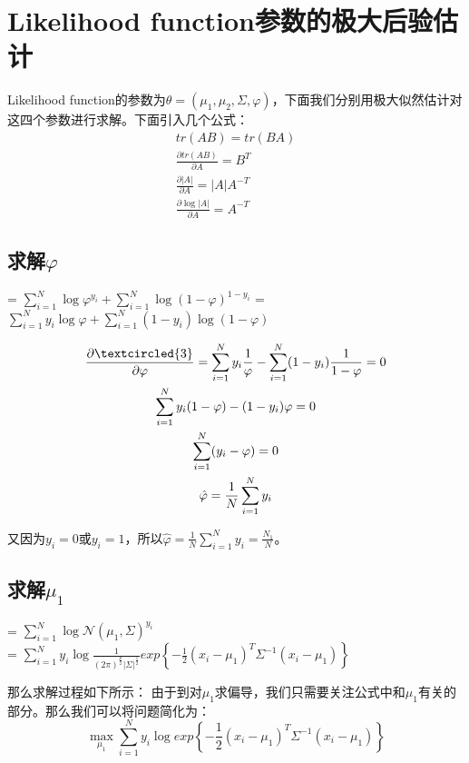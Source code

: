 \documentclass[a4paper]{article}
\begin{document}
\section{Likelihood function参数的极大后验估计}
Likelihood function的参数为$\theta = (\mu_1,\mu_2,\Sigma,\varphi)$，下面我们分别用极大似然估计对这四个参数进行求解。下面引入几个公式：
\begin{gather}
    tr(AB) = tr(BA) \\
    \frac{\partial tr(AB)}{\partial A} = B^T \\
    \frac{\partial|A|}{\partial A} = |A|A^{-T} \\
    \frac{\partial \log|A|}{\partial A} = A^{-T}
\end{gather}

\subsection{求解$\varphi$}
\begin{center}
     = $\sum_{i=1}^N \log \varphi^{y_i} + \sum_{i=1}^N \log (1-\varphi)^{1-y_i}$ = $\sum_{i=1}^N y_i\log \varphi + \sum_{i=1}^N (1-y_i) \log (1-\varphi)$ 
\end{center}
\begin{gather}
    \frac{\partial   \textcircled{3}}{\partial \varphi} = \sum_{i=1}^Ny_i\frac{1}{\varphi} - \sum_{i=1}^N (1-y_i)\frac{1}{1-\varphi} = 0 \\
    \sum_{i=1}^N y_i(1-\varphi) - (1-y_i)\varphi = 0 \\
    \sum_{i=1}^N (y_i-\varphi) = 0\\
    \hat{\varphi} = \frac{1}{N} \sum_{i=1}^N y_i
\end{gather}

又因为$y_i=0$或$y_i=1$，所以$\hat{\varphi} = \frac{1}{N} \sum_{i=1}^N y_i = \frac{N_1}{N}$。

\subsection{求解$\mu_1$}
\begin{center}
     = $\sum_{i=1}^N\log \mathcal{N}(\mu_1,\Sigma)^{y_i}$ \\
    = $\sum_{i=1}^Ny_i\log \frac{1}{(2\pi)^{\frac{p}{2}}|\Sigma|^{\frac{1}{2}}}exp\left\{ -\frac{1}{2}(x_i-\mu_1)^T\Sigma^{-1}(x_i-\mu_1) \right\}$ \\
\end{center}

那么求解过程如下所示：
由于到对$\mu_1$求偏导，我们只需要关注公式中和$\mu_1$有关的部分。那么我们可以将问题简化为：
\begin{equation}
    \max_{\mu_1} \sum_{i=1}^Ny_i\log exp\left\{ -\frac{1}{2}(x_i-\mu_1)^T\Sigma^{-1}(x_i-\mu_1) \right\}
\end{equation}
\end{document}
